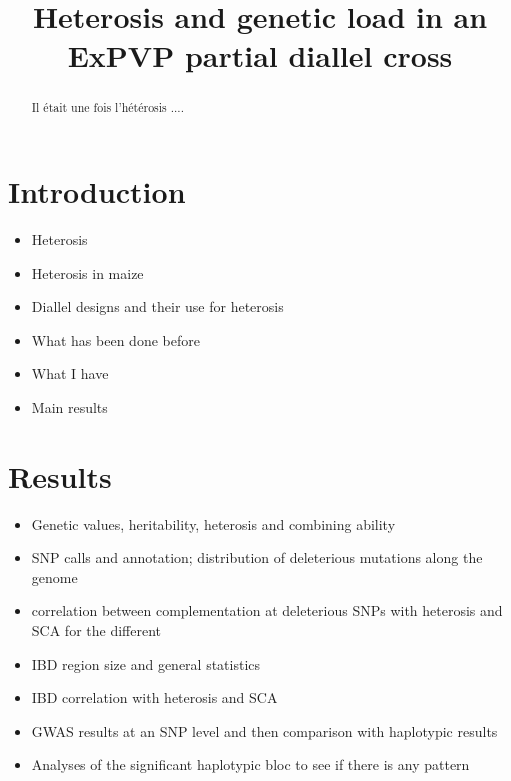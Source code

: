 \documentclass[10pt]{article}
\title{Heterosis and genetic load in an ExPVP partial diallel cross}
\date{}
\begin{document}
\maketitle
\begin{abstract} 
 Il \'etait une fois l'h\'et\'erosis ....
\end{abstract}


\newpage
\section*{Introduction}


\begin{itemize}
  \item Heterosis
  \item Heterosis in maize
  \item Diallel designs and their use for heterosis
  \item What has been done before
  \item What I have
  \item  Main results
\end{itemize}


\section*{Results}

\begin{itemize}
  \item Genetic values, heritability, heterosis and combining ability 
  \item SNP calls and annotation; distribution of deleterious mutations along the genome 
  \item correlation between complementation at deleterious SNPs with heterosis and SCA for the different 
  \item IBD region size and general statistics 
  \item IBD correlation with heterosis and SCA
  \item GWAS results at an SNP level and then comparison with haplotypic results 
  \item Analyses of the significant haplotypic bloc to see if there is any pattern
\end{itemize}
\end{document}
